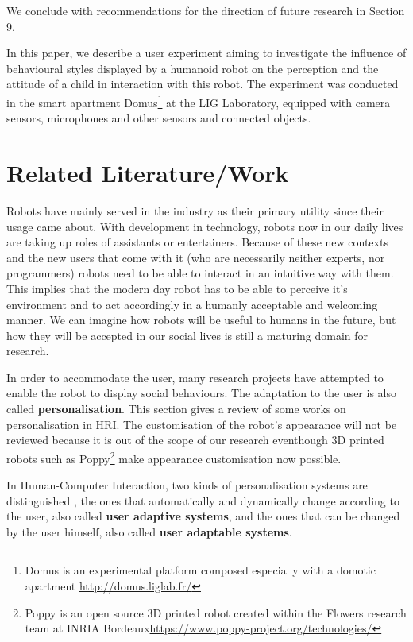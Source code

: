 \documentclass[a4paper,twocolumn]{svjour3}
\begin{document}
We conclude with recommendations for the direction of future research in Section 9.

In this paper, we describe a user experiment aiming to investigate the influence of behavioural styles displayed by a humanoid robot on the perception and the attitude of a child in interaction with this robot. 
The experiment was conducted in the smart apartment Domus\footnote{Domus is an experimental platform composed especially with a domotic apartment \url{http://domus.liglab.fr/}} at the LIG Laboratory, equipped with camera sensors, microphones and other sensors and connected objects. 



\section{Related Literature/Work}
Robots have mainly served in the industry as their primary utility since their usage came about.
With development in technology, robots now in our daily lives are taking up roles of assistants or entertainers. 
Because of these new contexts and the new users that come with it (who are necessarily neither experts, nor programmers) robots need to be able to interact in an intuitive way with them. 
This implies that the modern day robot has to be able to perceive it's environment and to act accordingly in a humanly acceptable and welcoming manner. 
We can imagine how robots will be useful to humans in the future, but how they will be accepted in our social lives is still a maturing domain for research.


In order to accommodate the user, many research projects have attempted to enable the robot to display social behaviours.
The adaptation to the user is also called \textbf{personalisation}.
This section gives a review of some works on personalisation in HRI.
The customisation of the robot's appearance will not be reviewed because it is out of the scope of our research eventhough 3D printed robots such as Poppy\footnote{Poppy is an open source 3D printed robot created within the Flowers research team at INRIA Bordeaux\url{https://www.poppy-project.org/technologies/}} make appearance customisation now possible.  

In Human-Computer Interaction, two kinds of personalisation systems are distinguished \cite{Fischer2001,Oppermann1997}, the ones that automatically and dynamically change according to the user, also called \textbf{user adaptive systems}, and the ones that can be changed by the user himself, also called \textbf{user adaptable systems}. 
\end{document}
